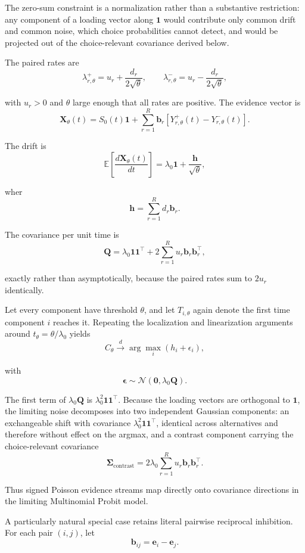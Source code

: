 \documentclass[
  man,
  floatsintext,
  longtable,
  a4paper,
  nolmodern,
  notxfonts,
  notimes,
  colorlinks=true,linkcolor=blue,citecolor=blue,urlcolor=blue]{apa7}
\begin{document}
The zero-sum constraint is a normalization rather than a substantive
restriction: any component of a loading vector along \(\mathbf 1\) would
contribute only common drift and common noise, which choice
probabilities cannot detect, and would be projected out of the
choice-relevant covariance derived below.

The paired rates are \[
\lambda_{r,\theta}^{+}
=
u_r+\frac{d_r}{2\sqrt{\theta}},
\qquad
\lambda_{r,\theta}^{-}
=
u_r-\frac{d_r}{2\sqrt{\theta}},
\]

with \(u_r>0\) and \(\theta\) large enough that all rates are positive.
The evidence vector is \[
\mathbf X_\theta(t)
=
S_0(t)\mathbf 1
+
\sum_{r=1}^{R}
\mathbf b_r
\left[
Y_{r,\theta}^{+}(t)
-
Y_{r,\theta}^{-}(t)
\right].
\]

The drift is \[
\mathbb E
\left[
\frac{d\mathbf X_\theta(t)}{dt}
\right]
=
\lambda_0\mathbf 1
+
\frac{\mathbf h}{\sqrt{\theta}},
\]

wher \[
\mathbf h
=
\sum_{r=1}^{R}d_r\mathbf b_r.
\]

The covariance per unit time is \[
\mathbf Q
=
\lambda_0\mathbf 1\mathbf 1^\top
+
2\sum_{r=1}^{R}
u_r\mathbf b_r\mathbf b_r^\top,
\]

exactly rather than asymptotically, because the paired rates sum to
\(2u_r\) identically.

Let every component have threshold \(\theta\), and let \(T_{i,\theta}\)
again denote the first time component \(i\) reaches it. Repeating the
localization and linearization arguments around
\(t_\theta=\theta/\lambda_0\) yields \[
C_\theta
\xrightarrow{d}
\arg\max_i
\left(
h_i+\epsilon_i
\right),
\]

with \[
\boldsymbol\epsilon
\sim
\mathcal N(\mathbf 0,\lambda_0\mathbf Q).
\]

The first term of \(\lambda_0\mathbf Q\) is
\(\lambda_0^2\mathbf 1\mathbf 1^\top\). Because the loading vectors are
orthogonal to \(\mathbf 1\), the limiting noise decomposes into two
independent Gaussian components: an exchangeable shift with covariance
\(\lambda_0^2\mathbf 1\mathbf 1^\top\), identical across alternatives
and therefore without effect on the argmax, and a contrast component
carrying the choice-relevant covariance \[
\boldsymbol\Sigma_{\mathrm{contrast}}
=
2\lambda_0
\sum_{r=1}^{R}
u_r\mathbf b_r\mathbf b_r^\top.
\]

Thus signed Poisson evidence streams map directly onto covariance
directions in the limiting Multinomial Probit model.

A particularly natural special case retains literal pairwise reciprocal
inhibition. For each pair \((i,j)\), let \[
\mathbf b_{ij}
=
\mathbf e_i-\mathbf e_j.
\]
\end{document}

